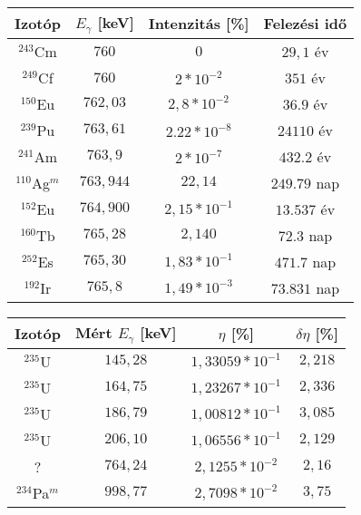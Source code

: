 \begin{center}
\begin{tabular}{|c|c|c|c|}
\hline
Izotóp 			 & $E_{\gamma}$ [keV] & Intenzitás [\%] & Felezési idő \\
\hline
$^{243}$Cm       & $760$     & $0$              & $29,1$ év    \\
$^{249}$Cf       & $760$     & $2 * 10^{-2}$    & $351$ év     \\
$^{150}$Eu       & $762,03$  & $2,8 * 10^{-2}$  & $36.9$ év    \\
$^{239}$Pu       & $763,61$  & $2.22 * 10^{-8}$ & $24110$ év   \\
$^{241}$Am       & $763,9$   & $2 * 10^{-7}$    & $432.2$ év   \\
$^{110}$Ag$^{m}$ & $763,944$ & $22,14$          & $249.79$ nap \\
$^{152}$Eu       & $764,900$ & $2,15 * 10^{-1}$ & $	13.537$ év \\
$^{160}$Tb       & $765,28$  & $2,140$          & $72.3$ nap   \\
$^{252}$Es       & $765,30$  & $1,83 * 10^{-1}$ & $471.7$ nap  \\
$^{192}$Ir       & $765,8$   & $1,49 * 10^{-3}$ & $73.831$ nap \\
\hline
\end{tabular}
 \label{table:2}
\end{center}

\begin{center}
\begin{tabular}{|c|c|c|c|}
\hline
Izotóp 			 & Mért $E_{\gamma}$ [keV] & $\eta$ [\%]          & $\delta \eta$ [\%] \\
\hline
$^{235}$U 		 & $145,28$                & $1,33059 * 10^{-1}$  & $2,218$            \\
$^{235}$U 		 & $164,75$ 	           & $1,23267 * 10^{-1}$  & $2,336$            \\
$^{235}$U 		 & $186,79$ 	           & $1,00812 * 10^{-1}$  & $3,085$            \\
$^{235}$U        & $206,10$ 	           & $1,06556 * 10^{-1}$  & $2,129$            \\
?                & $764,24$ 	           & $2,1255 * 10^{-2}$   & $2,16$             \\
$^{234}$Pa$^{m}$ & $998,77$ 	           & $2,7098 * 10^{-2}$   & $3,75$             \\
\hline
\end{tabular}
 \label{table:3}
\end{center}

